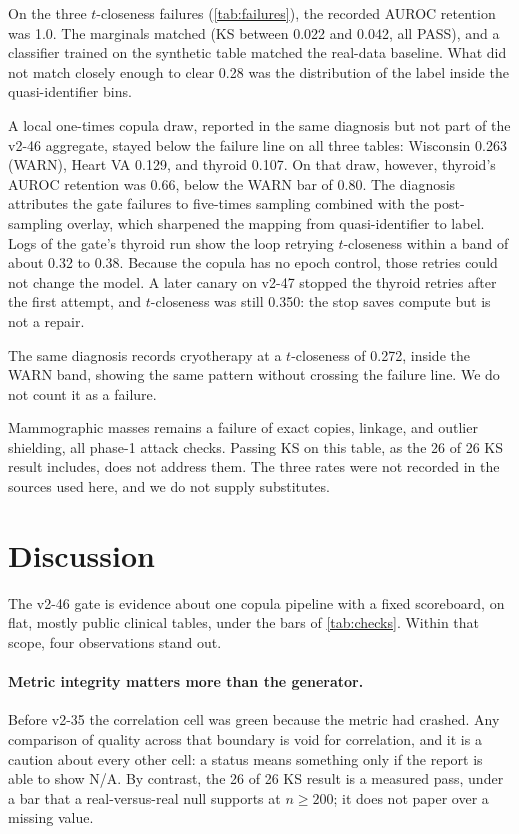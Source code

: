 \documentclass[11pt,a4paper]{article}
\begin{document}
On the three $t$-closeness failures (\cref{tab:failures}), the recorded AUROC retention was 1.0. The marginals matched (KS between 0.022 and 0.042, all PASS), and a classifier trained on the synthetic table matched the real-data baseline. What did not match closely enough to clear 0.28 was the distribution of the label inside the quasi-identifier bins.

A local one-times copula draw, reported in the same diagnosis but not part of the v2-46 aggregate, stayed below the failure line on all three tables: Wisconsin 0.263 (WARN), Heart VA 0.129, and thyroid 0.107. On that draw, however, thyroid's AUROC retention was 0.66, below the WARN bar of 0.80. The diagnosis attributes the gate failures to five-times sampling combined with the post-sampling overlay, which sharpened the mapping from quasi-identifier to label. Logs of the gate's thyroid run show the loop retrying $t$-closeness within a band of about 0.32 to 0.38. Because the copula has no epoch control, those retries could not change the model. A later canary on v2-47 stopped the thyroid retries after the first attempt, and $t$-closeness was still 0.350: the stop saves compute but is not a repair.

The same diagnosis records cryotherapy at a $t$-closeness of 0.272, inside the WARN band, showing the same pattern without crossing the failure line. We do not count it as a failure.

Mammographic masses remains a failure of exact copies, linkage, and outlier shielding, all phase-1 attack checks. Passing KS on this table, as the 26 of 26 KS result includes, does not address them. The three rates were not recorded in the sources used here, and we do not supply substitutes.

\section{Discussion}\label{sec:discussion}

The v2-46 gate is evidence about one copula pipeline with a fixed scoreboard, on flat, mostly public clinical tables, under the bars of \cref{tab:checks}. Within that scope, four observations stand out.

\paragraph{Metric integrity matters more than the generator.}
Before v2-35 the correlation cell was green because the metric had crashed. Any comparison of quality across that boundary is void for correlation, and it is a caution about every other cell: a status means something only if the report is able to show N/A. By contrast, the 26 of 26 KS result is a measured pass, under a bar that a real-versus-real null supports at $n \ge 200$; it does not paper over a missing value.
\end{document}
